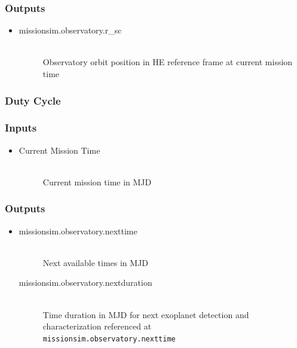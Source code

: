 \documentclass[]{asme2ej}
\begin{document}
\subsubsection*{Outputs}
\begin{itemize}
    \item
    \begin{description}
        \item[missionsim.observatory.r\_sc] \hfill \\
        Observatory orbit position in HE reference frame at current mission time
    \end{description}
\end{itemize}

\subsubsection{Duty Cycle}

\subsubsection*{Inputs}
\begin{itemize}
    \item
    \begin{description}
        \item[Current Mission Time] \hfill \\
        Current mission time in MJD
    \end{description}
\end{itemize}

\subsubsection*{Outputs}
\begin{itemize}
    \item
    \begin{description}
        \item[missionsim.observatory.nexttime] \hfill \\
        Next available times in MJD
        \item[missionsim.observatory.nextduration] \hfill \\
        Time duration in MJD for next exoplanet detection and characterization referenced at \\ \texttt{missionsim.observatory.nexttime}
    \end{description}
\end{itemize}
\end{document}
